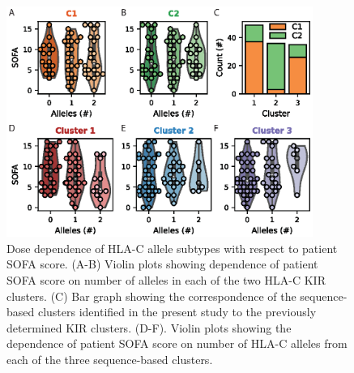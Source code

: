 \documentclass[utf8]{frontiers_suppmat} %
\begin{document}
\begin{figure}[htbp]
\begin{center}
\includegraphics[width=10cm]{FigureS3}
\end{center}
\caption{Dose dependence of HLA-C allele subtypes with respect to patient SOFA score. (A-B) Violin plots showing dependence of patient SOFA score on number of alleles in each of the two HLA-C KIR clusters. (C) Bar graph showing the correspondence of the sequence-based clusters identified in the present study to the previously determined KIR clusters. (D-F). Violin plots showing the dependence of patient SOFA score on number of HLA-C alleles from each of the three sequence-based clusters. }\label{fig:3}
\end{figure}



%
\end{document}

